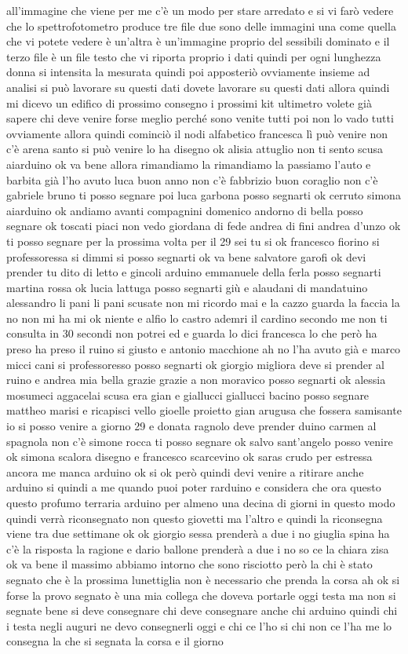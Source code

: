 {all'immagine che viene per me c'è un modo per stare arredato e si vi farò vedere che lo spettrofotometro produce tre file due sono delle immagini una come quella che vi potete vedere è un'altra è un'immagine proprio del sessibili dominato e il terzo file è un file testo che vi riporta proprio i dati quindi per ogni lunghezza donna si intensita la mesurata quindi poi apposteriò ovviamente insieme ad analisi si può lavorare su questi dati dovete lavorare su questi dati allora quindi mi dicevo un edifico di prossimo consegno i prossimi kit ultimetro volete già sapere chi deve venire forse meglio perché sono venite tutti poi non lo vado tutti ovviamente allora quindi cominciò il nodi alfabetico francesca lì può venire non c'è arena santo si può venire lo ha disegno ok alisia attuglio non ti sento scusa aiarduino ok va bene allora rimandiamo la rimandiamo la passiamo l'auto e barbita già l'ho avuto luca buon anno non c'è fabbrizio buon coraglio non c'è gabriele bruno ti posso segnare poi luca garbona posso segnarti ok cerruto simona aiarduino ok andiamo avanti compagnini domenico andorno di bella posso segnare ok toscati piaci non vedo giordana di fede andrea di fini andrea d'unzo ok ti posso segnare per la prossima volta per il 29 sei tu si ok francesco fiorino si professoressa si dimmi si posso segnarti ok va bene salvatore garofi ok devi prender tu dito di letto e gincoli arduino emmanuele della ferla posso segnarti martina rossa ok lucia lattuga posso segnarti giù e alaudani di mandatuino alessandro li pani li pani scusate non mi ricordo mai e la cazzo guarda la faccia la no non mi ha mi ok niente e alfio lo castro ademri il cardino secondo me non ti consulta in 30 secondi non potrei ed e guarda lo dici francesca lo che però ha preso ha preso il ruino si giusto e antonio macchione ah no l'ha avuto già e marco micci cani si professoresso posso segnarti ok giorgio migliora deve si prender al ruino e andrea mia bella grazie grazie a non moravico posso segnarti ok alessia mosumeci aggacelai scusa era gian e giallucci giallucci bacino posso segnare mattheo marisi e ricapisci vello gioelle proietto gian arugusa che fossera samisante io si posso venire a giorno 29 e donata ragnolo deve prender duino carmen al spagnola non c'è simone rocca ti posso segnare ok salvo sant'angelo posso venire ok simona scalora disegno e francesco scarcevino ok saras crudo per estressa ancora me manca arduino ok si ok però quindi devi venire a ritirare anche arduino si quindi a me quando puoi poter rarduino e considera che ora questo questo profumo terraria arduino per almeno una decina di giorni in questo modo quindi verrà riconsegnato non questo giovetti ma l'altro e quindi la riconsegna viene tra due settimane ok ok giorgio sessa prenderà a due i no giuglia spina ha c'è la risposta la ragione e dario ballone prenderà a due i no so ce la chiara zisa ok va bene il massimo abbiamo intorno che sono risciotto però la chi è stato segnato che è la prossima lunettiglia non è necessario che prenda la corsa ah ok si forse la provo segnato è una mia collega che doveva portarle oggi testa ma non si segnate bene si deve consegnare chi deve consegnare anche chi arduino quindi chi i testa negli auguri ne devo consegnerli oggi e chi ce l'ho si chi non ce l'ha me lo consegna la che si segnata la corsa e il giorno }
